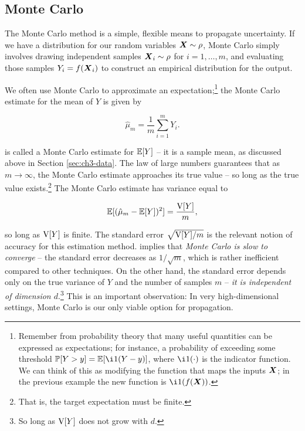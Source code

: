 \documentclass[../primer.tex]{subfiles}
\begin{document}
\subsection{Monte Carlo}
The Monte Carlo method is a simple, flexible means to propagate uncertainty. If
we have a distribution for our random variables $\boldsymbol{X}\sim\rho$, Monte Carlo
simply involves drawing independent samples $\boldsymbol{X}_i\sim\rho$ for $i=1,\dots,m$,
and evaluating those samples $Y_i = f(\boldsymbol{X}_i)$ to construct an empirical
distribution for the output.

We often use Monte Carlo to approximate an expectation;\footnote{Remember from
  probability theory that many useful quantities can be expressed as
  expectations; for instance, a probability of exceeding some threshold $\P[Y>y]
  = \E[\i1(Y-y)]$, where $\i1(\cdot)$ is the indicator function. We can think of
  this as modifying the function that maps the inputs $\boldsymbol{X}$; in the previous
  example the new function is $\i1(f(\mX))$.} the Monte Carlo estimate for the
mean of $Y$ is given by

\begin{equation} \label{eq:ch4-mc-mean}
  \hat{\mu}_m = \frac{1}{m}\sum_{i=1}^m Y_i.
\end{equation}

\noindent {} is called a Monte Carlo estimate for $\mathbb{E}[Y]$ --
it is a sample mean, as discussed above in Section \ref{sec:ch3-data}. The law
of large numbers guarantees that as $m\to\infty$, the Monte Carlo estimate
approaches its true value -- so long as the true value
exists.\cite{owen2013montecarlo}\footnote{That is, the target expectation must
  be finite.} The Monte Carlo estimate has variance equal to

\begin{equation} \label{eq:ch4-mc-var}
  \mathbb{E}[(\hat{\mu}_m - \mathbb{E}[Y])^2] = \frac{\mathrm{V}[Y]}{m},
\end{equation}

\noindent so long as $\mathrm{V}[Y]$ is finite. The standard error $\sqrt{\mathrm{V}[Y]/m}$ is
the relevant notion of accuracy for this estimation method. 
implies that \emph{Monte Carlo is slow to converge} -- the standard error
decreases as $1/\sqrt{m}$, which is rather inefficient compared to other
techniques. On the other hand, the standard error depends only on the true
variance of $Y$ and the number of samples $m$ -- \emph{it is independent of
  dimension $d$}.\footnote{So long as $\mathrm{V}[Y]$ does not grow with $d$.} This is
an important observation: In very high-dimensional settings, Monte Carlo is our
only viable option for propagation.
\end{document}
